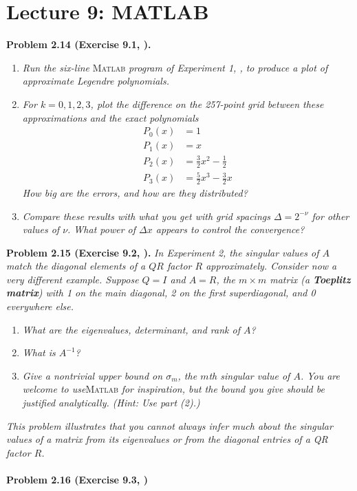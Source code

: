 \documentclass[a4paper,oneside]{book}
\numberwithin{equation}{chapter}
\begin{document}
\section{Lecture 9: MATLAB}
\textbf{Problem 2.14 (Exercise 9.1, \cite{1}).} 
\begin{enumerate}
\item \textit{Run the six-line}\textsc{ Matlab}\textit{ program of Experiment 1, \cite{1}, to produce a plot of approximate Legendre polynomials.}
\item \textit{For $k=0,1,2,3$, plot the difference on the 257-point grid between these approximations and the exact polynomials}
\begin{align}
{P_0}\left( x \right) &= 1\\
{P_1}\left( x \right) &= x\\
{P_2}\left( x \right) &= \frac{3}{2}{x^2} - \frac{1}{2}\\
{P_3}\left( x \right) &= \frac{5}{2}{x^3} - \frac{3}{2}x
\end{align}
\textit{How big are the errors, and how are they distributed?}
\item \textit{Compare these results with what you get with grid spacings $\Delta =2^{-\nu}$ for other values of $\nu$. What power of $\Delta x$ appears to control the convergence?}
\end{enumerate}
\textbf{Problem 2.15 (Exercise 9.2, \cite{1}).} \textit{In Experiment 2, the singular values of $A$ match the diagonal elements of a $QR$ factor $R$  approximately. Consider now a very different example. Suppose $Q=I$ and $A=R$, the $m\times m$ matrix (a \textbf{Toeplitz matrix}) with 1 on the main diagonal, 2 on the first superdiagonal, and 0 everywhere else.}
\begin{enumerate}
\item \textit{What are the eigenvalues, determinant, and rank of $A$?}
\item \textit{What is $A^{-1}$?}
\item \textit{Give a nontrivial upper bound on $\sigma _m$, the $m$th singular value of $A$. You are welcome to use}\textsc{Matlab}\textit{ for inspiration, but the bound you give should be justified analytically. (Hint: Use part (2).)}
\end{enumerate}
\textit{This problem illustrates that you cannot always infer much about the singular values of a matrix from its eigenvalues or from the diagonal entries of a QR factor $R$.}\\
\\
\textbf{Problem 2.16 (Exercise 9.3, \cite{1})} 
\end{document}
